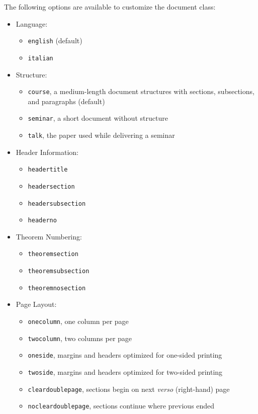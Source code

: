 \documentclass[english,course,twocolumn]{notes}
\begin{document}
The following options are available to customize the document class:
\begin{itemize}
\item Language:
    \begin{itemize}
    \item \verb|english| (default)
    \item \verb|italian|
    \end{itemize}
\item Structure:
    \begin{itemize}
    \item \verb|course|, a medium-length document structures with sections, subsections, and paragraphs (default)
    \item \verb|seminar|, a short document without structure
    \item \verb|talk|, the paper used while delivering a seminar
    \end{itemize}
\item Header Information:
    \begin{itemize}
    \item \verb|headertitle|
    \item \verb|headersection|
    \item \verb|headersubsection|
    \item \verb|headerno|
    \end{itemize}
\item Theorem Numbering:
    \begin{itemize}
    \item \verb|theoremsection|
    \item \verb|theoremsubsection|
    \item \verb|theoremnosection|
    \end{itemize}
\item Page Layout:
    \begin{itemize}
    \item \verb|onecolumn|, one column per page
    \item \verb|twocolumn|, two columns per page
    \item \verb|oneside|, margins and headers optimized for one-sided printing
    \item \verb|twoside|, margins and headers optimized for two-sided printing
    \item \verb|cleardoublepage|, sections begin on next \emph{verso} (right-hand) page
    \item \verb|nocleardoublepage|, sections continue where previous ended
    \end{itemize}
\end{itemize}
\end{document}
